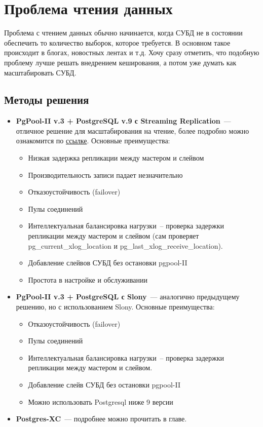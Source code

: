 \section{Проблема чтения данных}

Проблема с чтением данных обычно начинается, когда СУБД не в состоянии обеспечить то количество выборок, которое требуется. 
В основном такое происходит в блогах, новостных лентах и т.д. Хочу сразу отметить, что подобную проблему лучше решать 
внедрением кеширования, а потом уже думать как масштабировать СУБД.

\subsection{Методы решения}

\begin{itemize}
\item \textbf{PgPool-II v.3 + PostgreSQL v.9 с Streaming Replication}~--- отличное решение для масштабирования на чтение, 
более подробно можно ознакомится по \href{http://pgpool.projects.pgfoundry.org/contrib\_docs/simple\_sr\_setting/index.html}{ссылке}. 
Основные преимущества:
\begin{itemize}
\item Низкая задержка репликации между мастером и слейвом
\item Производительность записи падает незначительно
\item Отказоустойчивость (failover)
\item Пулы соединений
\item Интеллектуальная балансировка нагрузки~-- проверка задержки репликации между мастером и слейвом (сам проверяет pg\_current\_xlog\_location и pg\_last\_xlog\_receive\_location).
\item Добавление слейвов СУБД без остановки pgpool-II
\item Простота в настройке и обслуживании
\end{itemize}

\item \textbf{PgPool-II v.3 + PostgreSQL с Slony}~--- аналогично предыдущему решению, но с использованием Slony.
Основные преимущества:
\begin{itemize}
\item Отказоустойчивость (failover)
\item Пулы соединений
\item Интеллектуальная балансировка нагрузки~-- проверка задержки репликации между мастером и слейвом.
\item Добавление слейв СУБД без остановки pgpool-II
\item Можно использовать Postgresql ниже 9 версии
\end{itemize}

\item \textbf{Postgres-XC}~--- подробнее можно прочитать в  главе.
\end{itemize}

